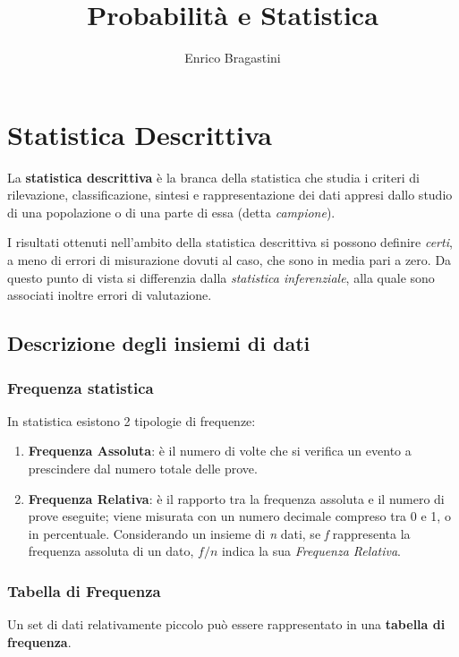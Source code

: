 \documentclass[12pt,oneside,draft]{book}
\title{\Large{\textbf{Probabilità e Statistica}}}
\author{Enrico Bragastini}
\begin{document}
\pagestyle{fancy}
\fancyhf{}
\rhead{}
\lhead{\nouppercase\leftmark}
\cfoot{\thepage}
\frontmatter

\maketitle
\tableofcontents

\mainmatter

\chapter{Statistica Descrittiva}
La \textbf{statistica descrittiva} è la branca della statistica che studia i criteri di rilevazione,
classificazione, sintesi e rappresentazione dei dati appresi dallo studio di una popolazione o di
una parte di essa (detta \textit{campione}).

I risultati ottenuti nell'ambito della statistica descrittiva si possono definire \emph{certi}, a meno di errori
di misurazione dovuti al caso, che sono in media pari a zero. Da questo punto di vista si differenzia dalla \emph{statistica inferenziale}, alla quale sono associati inoltre errori di valutazione.

\section{Descrizione degli insiemi di dati}
\subsection{Frequenza statistica}
In statistica esistono 2 tipologie di frequenze:
\begin{enumerate}
    \item \textbf{Frequenza Assoluta}: è il numero di volte che si verifica un evento a prescindere dal numero totale delle prove.
    \item \textbf{Frequenza Relativa}: è il rapporto tra la frequenza assoluta e il numero di prove eseguite; viene misurata con un numero decimale compreso tra 0 e 1, o in percentuale.
          Considerando un insieme di \emph{n} dati, se \emph{f} rappresenta la frequenza assoluta di un dato, $f/n$ indica la sua \emph{Frequenza Relativa}.
\end{enumerate}

\subsection{Tabella di Frequenza}
Un set di dati relativamente piccolo può essere rappresentato in una \textbf{tabella di frequenza}.
\end{document}
